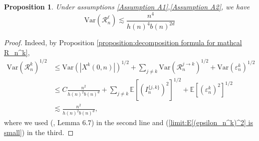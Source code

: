 \documentclass[12pt]{article}
\newcommand{\R}{\mathcal R}
\newcommand{\EE}{\mathbb E}
\newcommand{\1}{\mathds{1}}
\newcommand{\Var}{\mathrm{Var}}
\newtheorem{proposition}{Proposition}
\numberwithin{equation}{section}
\begin{document}
\begin{proposition}
    Under assumptions \ref{Assumption A1},\ref{Assumption A2}, we have
    \begin{equation*}
        \Var\left(\R_n^{\ell}\right)\lesssim\frac{n^4}{h(n)^4b(n)^{2d}}
    \end{equation*}
\end{proposition}
\begin{proof}
    Indeed, by Proposition \ref{proposition:decomposition formula for mathcal R_n^k},
    \begin{align*}
        \Var\left(\R_n^k\right)^{1/2}&\le \Var\left(\left|X^k(0,n)\right|\right)^{1/2}+\sum_{j\ne k}\Var\left(\R_n^{j\rightarrow k}\right)^{1/2}+\Var\left(\varepsilon_n^k\right)^{1/2}\\
        &\le C\frac{n^2}{h(n)^2b(n)^d}+\sum_{j\ne k}\EE\left[\left(I_n^{\{j,k\}}\right)^2\right]^{1/2}+\EE\left[\left(\varepsilon_n^k\right)^2\right]^{1/2}\\
        &\lesssim\frac{n^2}{h(n)^2b(n)^d},
    \end{align*}
    where we used (\cite{LeGallRosenRangeOfStableRandomWalks1991}, Lemma 6.7) in the second line and (\ref{limit:E[(epsilon_n^k)^2] is small}) in the third.
\end{proof}
\end{document}
